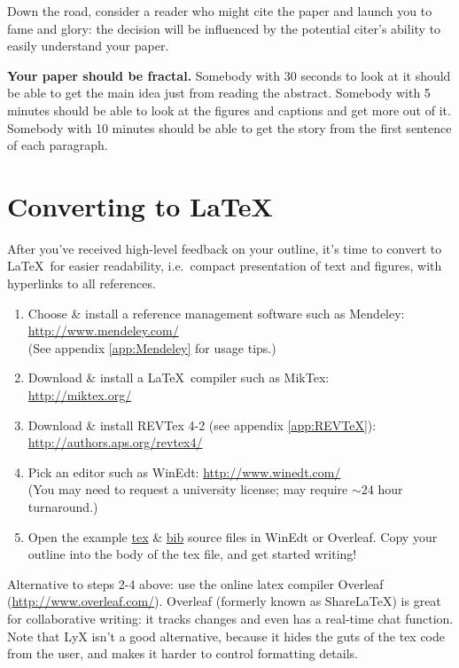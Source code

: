 \documentclass[aps,prb,twocolumn,superscriptaddress,floatfix,longbibliography]{revtex4-2}
\begin{document}
Down the road, consider a reader who might cite the paper and launch you to fame and glory: the decision will be influenced by the potential citer's ability to easily understand your paper.

\vspace{4mm}

\textbf{Your paper should be fractal.} Somebody with 30 seconds to look at it should be able to get the main idea just from reading the abstract. Somebody with 5 minutes should be able to look at the figures and captions and get more out of it. Somebody with 10 minutes should be able to get the story from the first sentence of each paragraph.

\section{\label{sec:LaTeX}Converting to \LaTeX}

After you've received high-level feedback on your outline, it's time to convert to \LaTeX\ for easier readability, i.e.\ compact presentation of text and figures, with hyperlinks to all references.

\begin{raggedright}
\begin{enumerate}
\item Choose \& install a reference management software such as Mendeley:
\url{http://www.mendeley.com/}\\
(See appendix \ref{app:Mendeley} for usage tips.)
\item Download \& install a \LaTeX\ compiler such as MikTex: \\
\url{http://miktex.org/}
\item Download \& install REVTex 4-2 (see appendix \ref{app:REVTeX}):\\
\url{http://authors.aps.org/revtex4/}
\item Pick an editor such as WinEdt:
\url{http://www.winedt.com/}\\
(You may need to request a university license; may require $\sim 24$ hour turnaround.)
\item Open the example \href{http://hoffman.physics.harvard.edu/policies/example-paper/Hoffman-example-paper.tex}{tex} \& \href{http://hoffman.physics.harvard.edu/policies/example-paper/Hoffman-example-paper.bib}{bib} source files in WinEdt or Overleaf. Copy your outline into the body of the tex file, and get started writing!
\end{enumerate}
\end{raggedright}
Alternative to steps 2-4 above: use the online latex compiler Overleaf (\url{http://www.overleaf.com/}). Overleaf (formerly known as Share\LaTeX) is great for collaborative writing: it tracks changes and even has a real-time chat function. Note that LyX isn't a good alternative, because it hides the guts of the tex code from the user, and makes it harder to control formatting details.
\end{document}
